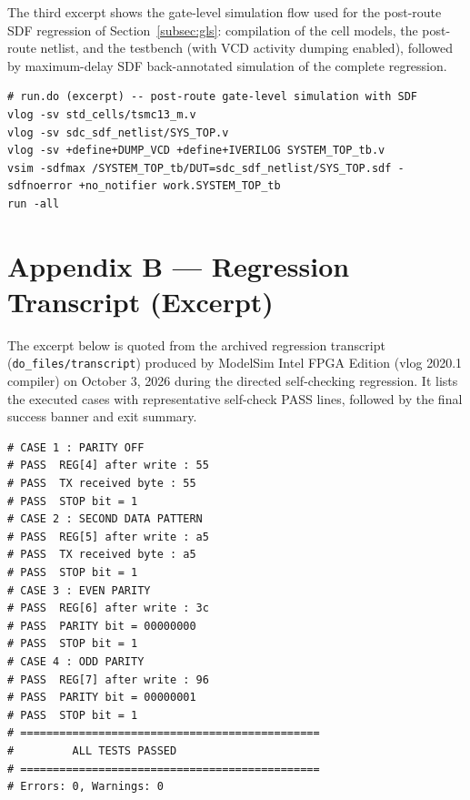 \documentclass[11pt,a4paper]{article}
\begin{document}
The third excerpt shows the gate-level simulation flow used for the post-route SDF regression of Section~\ref{subsec:gls}: compilation of the cell models, the post-route netlist, and the testbench (with VCD activity dumping enabled), followed by maximum-delay SDF back-annotated simulation of the complete regression.

\begin{lstlisting}
# run.do (excerpt) -- post-route gate-level simulation with SDF
vlog -sv std_cells/tsmc13_m.v
vlog -sv sdc_sdf_netlist/SYS_TOP.v
vlog -sv +define+DUMP_VCD +define+IVERILOG SYSTEM_TOP_tb.v
vsim -sdfmax /SYSTEM_TOP_tb/DUT=sdc_sdf_netlist/SYS_TOP.sdf -sdfnoerror +no_notifier work.SYSTEM_TOP_tb
run -all
\end{lstlisting}

\makeatletter{}\makeatother
{}
\label{app:regression}
\section*{Appendix B --- Regression Transcript (Excerpt)}

The excerpt below is quoted from the archived regression transcript (\texttt{do\_files/transcript}) produced by ModelSim Intel FPGA Edition (vlog 2020.1 compiler) on October 3, 2026 during the directed self-checking regression. It lists the executed cases with representative self-check PASS lines, followed by the final success banner and exit summary.

\begin{lstlisting}
# CASE 1 : PARITY OFF
# PASS  REG[4] after write : 55
# PASS  TX received byte : 55
# PASS  STOP bit = 1
# CASE 2 : SECOND DATA PATTERN
# PASS  REG[5] after write : a5
# PASS  TX received byte : a5
# PASS  STOP bit = 1
# CASE 3 : EVEN PARITY
# PASS  REG[6] after write : 3c
# PASS  PARITY bit = 00000000
# PASS  STOP bit = 1
# CASE 4 : ODD PARITY
# PASS  REG[7] after write : 96
# PASS  PARITY bit = 00000001
# PASS  STOP bit = 1
# ==============================================
#         ALL TESTS PASSED
# ==============================================
# Errors: 0, Warnings: 0
\end{lstlisting}

\makeatletter{}\makeatother
{}
\label{app:tooling}
\end{document}
